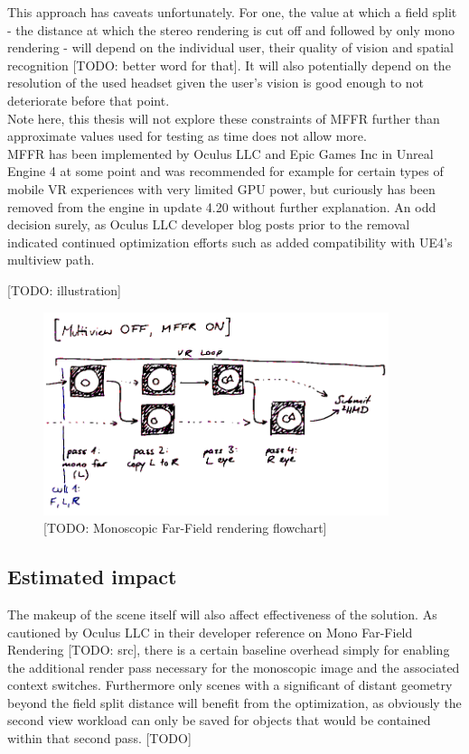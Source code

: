 This approach has caveats unfortunately. For one, the value at which a field split - the distance at which the stereo rendering is cut off and followed by only mono rendering - will depend on the individual user, their quality of vision and spatial recognition [TODO: better word for that]. It will also potentially depend on the resolution of the used headset given the user's vision is good enough to not deteriorate before that point. \\
Note here, this thesis will not explore these constraints of MFFR further than approximate values used for testing as time does not allow more. \\
MFFR has been implemented by Oculus LLC and Epic Games Inc in Unreal Engine 4 at some point and was recommended for example for certain types of mobile VR experiences with very limited GPU power, but curiously has been removed from the engine in update 4.20 without further explanation. An odd decision surely, as Oculus LLC developer blog posts prior to the removal indicated continued optimization efforts such as added compatibility with UE4's multiview path. 

[TODO: illustration]
\begin{figure}[htpb]
  \centering
  \includegraphics[width=0.9\textwidth]{pictures/flowchart_mffr}
  \caption{[TODO: Monoscopic Far-Field rendering flowchart]} \label{fig:flowchart_mffr}
\end{figure}

\subsection{Estimated impact}
The makeup of the scene itself will also affect effectiveness of the solution. As cautioned by Oculus LLC in their developer reference on Mono Far-Field Rendering [TODO: src], there is a certain baseline overhead simply for enabling the additional render pass necessary for the monoscopic image and the associated context switches. Furthermore only scenes with a significant of distant geometry beyond the field split distance will benefit from the optimization, as obviously the second view workload can only be saved for objects that would be contained within that second pass. 
[TODO]

